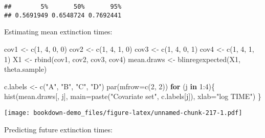 \documentclass[
]{book}
\newenvironment{Shaded}{\begin{snugshade}}{\end{snugshade}}
\newcommand{\AttributeTok}[1]{\textcolor[rgb]{0.77,0.63,0.00}{#1}}
\newcommand{\ControlFlowTok}[1]{\textcolor[rgb]{0.13,0.29,0.53}{\textbf{#1}}}
\newcommand{\DecValTok}[1]{\textcolor[rgb]{0.00,0.00,0.81}{#1}}
\newcommand{\FunctionTok}[1]{\textcolor[rgb]{0.00,0.00,0.00}{#1}}
\newcommand{\NormalTok}[1]{#1}
\newcommand{\OtherTok}[1]{\textcolor[rgb]{0.56,0.35,0.01}{#1}}
\newcommand{\SpecialCharTok}[1]{\textcolor[rgb]{0.00,0.00,0.00}{#1}}
\newcommand{\StringTok}[1]{\textcolor[rgb]{0.31,0.60,0.02}{#1}}
\begin{document}
\begin{verbatim}
##        5%       50%       95% 
## 0.5691949 0.6548724 0.7692441
\end{verbatim}

Estimating mean extinction times:

\begin{Shaded}
\begin{Highlighting}[]
\NormalTok{cov1 }\OtherTok{\textless{}{-}} \FunctionTok{c}\NormalTok{(}\DecValTok{1}\NormalTok{, }\DecValTok{4}\NormalTok{, }\DecValTok{0}\NormalTok{, }\DecValTok{0}\NormalTok{)}
\NormalTok{cov2 }\OtherTok{\textless{}{-}} \FunctionTok{c}\NormalTok{(}\DecValTok{1}\NormalTok{, }\DecValTok{4}\NormalTok{, }\DecValTok{1}\NormalTok{, }\DecValTok{0}\NormalTok{)}
\NormalTok{cov3 }\OtherTok{\textless{}{-}} \FunctionTok{c}\NormalTok{(}\DecValTok{1}\NormalTok{, }\DecValTok{4}\NormalTok{, }\DecValTok{0}\NormalTok{, }\DecValTok{1}\NormalTok{)}
\NormalTok{cov4 }\OtherTok{\textless{}{-}} \FunctionTok{c}\NormalTok{(}\DecValTok{1}\NormalTok{, }\DecValTok{4}\NormalTok{, }\DecValTok{1}\NormalTok{, }\DecValTok{1}\NormalTok{)}
\NormalTok{X1 }\OtherTok{\textless{}{-}} \FunctionTok{rbind}\NormalTok{(cov1, cov2, cov3, cov4)}
\NormalTok{mean.draws }\OtherTok{\textless{}{-}} \FunctionTok{blinregexpected}\NormalTok{(X1, theta.sample)}
\end{Highlighting}
\end{Shaded}

\begin{Shaded}
\begin{Highlighting}[]
\NormalTok{c.labels }\OtherTok{\textless{}{-}} \FunctionTok{c}\NormalTok{(}\StringTok{"A"}\NormalTok{, }\StringTok{"B"}\NormalTok{, }\StringTok{"C"}\NormalTok{, }\StringTok{"D"}\NormalTok{)}
\FunctionTok{par}\NormalTok{(}\AttributeTok{mfrow=}\FunctionTok{c}\NormalTok{(}\DecValTok{2}\NormalTok{, }\DecValTok{2}\NormalTok{))}
 \ControlFlowTok{for}\NormalTok{ (j }\ControlFlowTok{in} \DecValTok{1}\SpecialCharTok{:}\DecValTok{4}\NormalTok{)\{}
   \FunctionTok{hist}\NormalTok{(mean.draws[, j],}
      \AttributeTok{main=}\FunctionTok{paste}\NormalTok{(}\StringTok{"Covariate set"}\NormalTok{,}
\NormalTok{                 c.labels[j]),}
      \AttributeTok{xlab=}\StringTok{"log TIME"}\NormalTok{)}
\NormalTok{\}}
\end{Highlighting}
\end{Shaded}

\texttt{[image: bookdown-demo\_files/figure-latex/unnamed-chunk-217-1.pdf]}

Predicting future extinction times:
\end{document}
